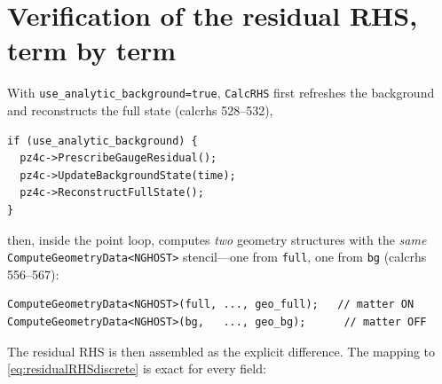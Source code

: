 \documentclass[11pt]{article}
\newcommand{\code}[1]{\texttt{#1}}
\begin{document}
\section{Verification of the residual RHS, term by term}
\label{sec:rhs}

With \code{use\_analytic\_background=true}, \code{CalcRHS} first refreshes the
background and reconstructs the full state (calcrhs 528--532),
\begin{lstlisting}
if (use_analytic_background) {
  pz4c->PrescribeGaugeResidual();
  pz4c->UpdateBackgroundState(time);
  pz4c->ReconstructFullState();
}
\end{lstlisting}
then, inside the point loop, computes \emph{two} geometry structures with the
\emph{same} \code{ComputeGeometryData<NGHOST>} stencil---one from
\code{full}, one from \code{bg} (calcrhs 556--567):
\begin{lstlisting}
ComputeGeometryData<NGHOST>(full, ..., geo_full);   // matter ON
ComputeGeometryData<NGHOST>(bg,   ..., geo_bg);      // matter OFF
\end{lstlisting}
The residual RHS is then assembled as the explicit difference. The mapping to
\eqref{eq:residualRHSdiscrete} is exact for every field:
\end{document}
